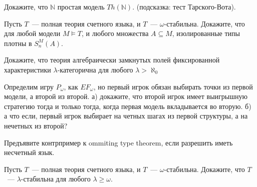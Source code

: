 \setcounter{curtask}{19}


\begin{task}
    Докажите, что $\mathbb{N}$ простая модель $Th(\mathbb{N})$. (подсказка: тест
    Тарского-Вота).
\end{task}

\begin{task}
    Пусть $T$~--- полная теория счетного языка, и $T$~---
    $\omega$-стабильна. Докажите, что для любой модели $M \models T$, и любого
    множества $A \subseteq M$, изолированные типы плотны в $S_n^M(A)$. 
\end{task}

\breakline


\begin{ptask}{6}
    Докажите, что теория алгебраически замкнутых полей фиксированной характеристики
    $\lambda$-категорична для любого $\lambda > \aleph_0$
\end{ptask}

\begin{ptask}{9}
    Определим игру $P_{\omega}$, как $EF_{\omega}$, но первый игрок обязан выбирать
    точки из первой модели, а второй из второй.
	а) докажите, что второй игрок имеет выигрышную стратегию тогда и только тогда,
    когда первая модель вкладывается во вторую.
    б) а что если, первый игрок выбирает на четных шагах из первой структуры, а на
    нечетных из второй?
\end{ptask}


\begin{ptask}{18}
    Предъявите контрпример к ommiting type theorem, если разрешить иметь несчетный
    язык.
\end{ptask}

\begin{ptask}{19}
    Пусть $T$~--- полная теория счетного языка, и $T$~---
    $\omega$-стабильна. Докажите, что $T$~--- $\lambda$-стабильна для любого $\lambda
    \ge \omega$.
\end{ptask}